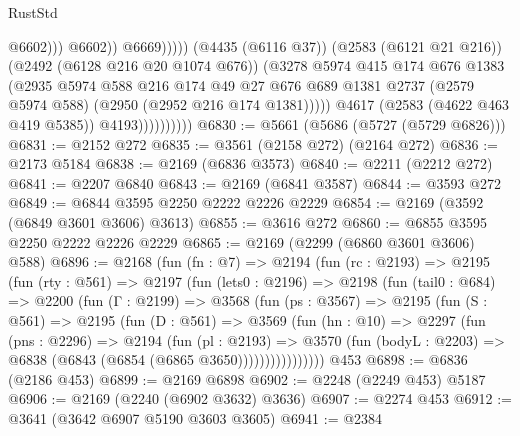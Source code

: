 \begin{lexlean}{RustStd}
\begin{coremodule}
                                              @6602)))
                                        @6602))
                                    @6669)))))
                          (@4435 (@6116 @37))
                          (@2583 (@6121 @21 @216))
                          (@2492 (@6128 @216 @20 @1074 @676))
                          (@3278
                            @5974
                            @415
                            @174
                            @676
                            @1383
                            (@2935
                              @5974
                              @588
                              @216
                              @174
                              @49
                              @27
                              @676
                              @689
                              @1381
                              @2737
                              (@2579 @5974 @588)
                              (@2950 (@2952 @216 @174 @1381)))))
                        @4617
                        (@2583 (@4622 @463 @419 @5385))
                        @4193))))))))))
@6830 := @5661 (@5686 (@5727 (@5729 @6826)))
@6831 := @2152 @272
@6835 := @3561 (@2158 @272) (@2164 @272)
@6836 := @2173 @5184
@6838 := @2169 (@6836 @3573)
@6840 := @2211 (@2212 @272)
@6841 := @2207 @6840
@6843 := @2169 (@6841 @3587)
@6844 := @3593 @272
@6849 := @6844 @3595 @2250 @2222 @2226 @2229
@6854 := @2169 (@3592 (@6849 @3601 @3606) @3613)
@6855 := @3616 @272
@6860 := @6855 @3595 @2250 @2222 @2226 @2229
@6865 := @2169 (@2299 (@6860 @3601 @3606) @588)
@6896 := @2168
    (fun (fn : @7) =>
    @2194
      (fun (rc : @2193) =>
      @2195
        (fun (rty : @561) =>
        @2197
          (fun (lets0 : @2196) =>
          @2198
            (fun (tail0 : @684) =>
            @2200
              (fun (Γ : @2199) =>
              @3568
                (fun (ps : @3567) =>
                @2195
                  (fun (S : @561) =>
                  @2195
                    (fun (D : @561) =>
                    @3569
                      (fun (hn : @10) =>
                      @2297
                        (fun (pns : @2296) =>
                        @2194
                          (fun (pl : @2193) =>
                          @3570
                            (fun (bodyL : @2203) => @6838 (@6843 (@6854 (@6865 @3650))))))))))))))))
    @453
@6898 := @6836 (@2186 @453)
@6899 := @2169 @6898
@6902 := @2248 (@2249 @453) @5187
@6906 := @2169 (@2240 (@6902 @3632) @3636)
@6907 := @2274 @453
@6912 := @3641 (@3642 @6907 @5190 @3603 @3605)
@6941 := @2384

\end{coremodule}
\end{lexlean}
